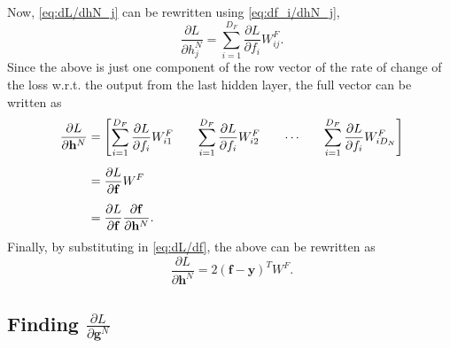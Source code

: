 \documentclass{article}
\newcommand{\pd}[0]{\phantom{.}}
\begin{document}
\vspace{1em}
Now, \cref{eq:dL/dhN_j} can be rewritten using \cref{eq:df_i/dhN_j},
\begin{equation}
    \phantom{.}\frac{\partial L}{\partial h^N_j} = \displaystyle\sum_{i=1}^{D_F}\frac{\partial L}{\partial f_i}W^F_{ij}.
\end{equation}
Since the above is just one component of the row vector of the rate of change of the loss w.r.t. the output from the last hidden layer, the full vector can be written as
\begin{align}
    \pd\frac{\partial L}{\partial \mathbf{h}^N} &=
    \begin{bmatrix}
        \displaystyle\sum_{i=1}^{D_F}\frac{\partial L}{\partial f_i}W^F_{i1}\quad & \displaystyle\sum_{i=1}^{D_F}\frac{\partial L}{\partial f_i}W^F_{i2}\quad & \cdots\quad & \displaystyle\sum_{i=1}^{D_F}\frac{\partial L}{\partial f_i}W^F_{i D_N}
    \end{bmatrix}\notag \\[0.5em]
    &= \frac{\partial L}{\partial \mathbf{f}}W^F\notag \\[0.5em]
    &= \frac{\partial L}{\partial \mathbf{f}}\frac{\partial \mathbf{f}}{\partial \mathbf{h}^N}.
\end{align}
Finally, by substituting in \cref{eq:dL/df}, the above can be rewritten as
\begin{equation}
    \pd\frac{\partial L}{\partial \mathbf{h}^N} = 2(\mathbf{f} - \mathbf{y})^T W^F.
\end{equation}


\subsection{Finding \texorpdfstring{$\frac{\partial L}{\partial \mathbf{g}^N}$}{dL/dgN}}
\label{sec:dL/dgN}
\end{document}
